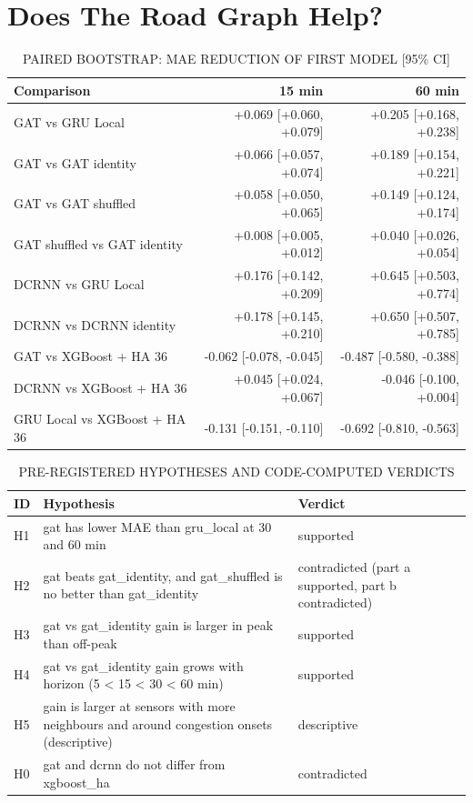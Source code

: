 \documentclass[conference]{IEEEtran}
\begin{document}
\section{Does The Road Graph Help?}
\begin{table}[t]
\caption{PAIRED BOOTSTRAP: MAE REDUCTION OF FIRST MODEL [95\% CI]}
\centering\footnotesize\setlength{\tabcolsep}{3pt}
\begin{tabularx}{\columnwidth}{>{\raggedright\arraybackslash}Xrr}
\toprule
Comparison & 15 min & 60 min\\
\midrule
GAT vs GRU Local & +0.069 [+0.060, +0.079] & +0.205 [+0.168, +0.238]\\
GAT vs GAT identity & +0.066 [+0.057, +0.074] & +0.189 [+0.154, +0.221]\\
GAT vs GAT shuffled & +0.058 [+0.050, +0.065] & +0.149 [+0.124, +0.174]\\
GAT shuffled vs GAT identity & +0.008 [+0.005, +0.012] & +0.040 [+0.026, +0.054]\\
DCRNN vs GRU Local & +0.176 [+0.142, +0.209] & +0.645 [+0.503, +0.774]\\
DCRNN vs DCRNN identity & +0.178 [+0.145, +0.210] & +0.650 [+0.507, +0.785]\\
GAT vs XGBoost + HA 36 & -0.062 [-0.078, -0.045] & -0.487 [-0.580, -0.388]\\
DCRNN vs XGBoost + HA 36 & +0.045 [+0.024, +0.067] & -0.046 [-0.100, +0.004]\\
GRU Local vs XGBoost + HA 36 & -0.131 [-0.151, -0.110] & -0.692 [-0.810, -0.563]\\
\bottomrule
\end{tabularx}
\end{table}
\begin{table}[t]
\caption{PRE-REGISTERED HYPOTHESES AND CODE-COMPUTED VERDICTS}
\centering\footnotesize\setlength{\tabcolsep}{3pt}
\begin{tabularx}{\columnwidth}{l>{\raggedright\arraybackslash}X>{\raggedright\arraybackslash}X}
\toprule
ID & Hypothesis & Verdict\\
\midrule
H1 & gat has lower MAE than gru\_local at 30 and 60 min & supported\\
H2 & gat beats gat\_identity, and gat\_shuffled is no better than gat\_identity & contradicted (part a supported, part b contradicted)\\
H3 & gat vs gat\_identity gain is larger in peak than off-peak & supported\\
H4 & gat vs gat\_identity gain grows with horizon (5 < 15 < 30 < 60 min) & supported\\
H5 & gain is larger at sensors with more neighbours and around congestion onsets (descriptive) & descriptive\\
H0 & gat and dcrnn do not differ from xgboost\_ha & contradicted\\
\bottomrule
\end{tabularx}
\end{table}
\end{document}
